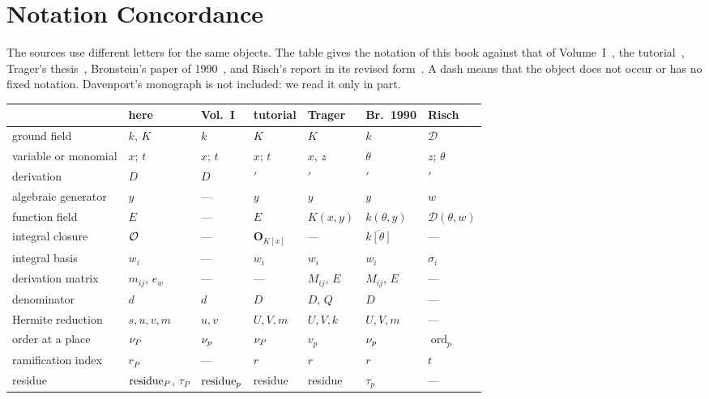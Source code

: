 \chapter{Notation Concordance}\label{app:concordance}

The sources use different letters for the same objects. The table gives the
notation of this book against that of Volume~I~\cite{bronstein2005}, the
tutorial~\cite{bronstein1998tutorial}, Trager's thesis~\cite{trager1984},
Bronstein's paper of 1990~\cite{bronstein1990}, and Risch's report in its
revised form~\cite{raab2022}. A dash means that the object does not occur
or has no fixed notation. Davenport's monograph is not included: we read it
only in part.

\begin{center}
\footnotesize
\setlength{\tabcolsep}{3pt}
\renewcommand{\arraystretch}{1.3}
\begin{longtable}{@{}>{\raggedright}p{.19\linewidth}llllll@{}}
\toprule
 & here & Vol.~I & tutorial & Trager & Br.~1990 & Risch \\
\midrule
\endhead
ground field & $k$, $K$ & $k$ & $K$ & $K$ & $k$ & $\mathcal{D}$ \\
variable or monomial & $x$; $t$ & $x$; $t$ & $x$; $t$ & $x$, $z$ & $\theta$ & $z$; $\theta$ \\
derivation & $D$ & $D$ & ${}'$ & ${}'$ & ${}'$ & ${}'$ \\
algebraic generator & $y$ & --- & $y$ & $y$ & $y$ & $w$ \\
function field & $E$ & --- & $E$ & $K(x, y)$ & $k(\theta, y)$ & $\mathcal{D}(\theta, w)$ \\
integral closure & $\mathcal{O}$ & --- & $\mathbf{O}_{K[x]}$ & --- & $\overline{k[\theta]}$ & --- \\
integral basis & $w_i$ & --- & $w_i$ & $w_i$ & $w_i$ & $\sigma_i$ \\
derivation matrix & $m_{ij}$, $e_w$ & --- & --- & $M_{ij}$, $E$ & $M_{ij}$, $E$ & --- \\
denominator & $d$ & $d$ & $D$ & $D$, $Q$ & $D$ & --- \\
Hermite reduction & $s, u, v, m$ & $u, v$ & $U, V, m$ & $U, V, k$ & $U, V, m$ & --- \\
order at a place & $\nu_{P}$ & $\nu_{p}$ & $\nu_{P}$ & $v_p$ & $\nu_{p}$ & $\operatorname{ord}_p$ \\
ramification index & $r_P$ & --- & $r$ & $r$ & $r$ & $t$ \\
residue & $\operatorname{residue}_P$, $\tau_P$ & $\operatorname{residue}_p$ & residue & residue & $\tau_p$ & --- \\

\end{longtable}
\end{center}
